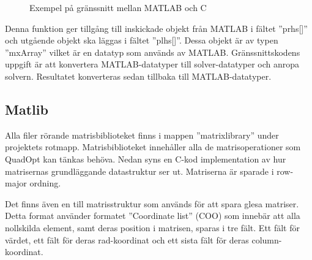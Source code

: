 \begin{figure}[H]

\caption{Exempel på gränssnitt mellan MATLAB och C}
\label{fig:mex2}
\end{figure}  

\noindent Denna funktion ger tillgång till inskickade objekt från MATLAB i fältet ''prhs[]'' och utgående objekt ska läggas i fältet ''plhs[]''. Dessa objekt är av typen ''mxArray'' vilket är en datatyp som används av MATLAB. Gränssnittskodens uppgift är att konvertera MATLAB-datatyper till solver-datatyper och anropa solvern. Resultatet konverteras sedan tillbaka till MATLAB-datatyper.


\subsection{Matlib}
Alla filer rörande matrisbiblioteket finns i mappen ''matrixlibrary'' under projektets rotmapp.
\newline
\newline
Matrisbiblioteket innehåller alla de matrisoperationer som QuadOpt kan tänkas behöva. Nedan syns en C-kod implementation av hur matrisernas grundläggande datastruktur ser ut. Matriserna är sparade i row-major ordning.



\noindent Det finns även en till matrisstruktur som används för att spara glesa matriser. Detta format använder formatet ''Coordinate list'' (COO) som innebär att alla nollskilda element, samt deras position i matrisen, sparas i tre fält. Ett fält för värdet, ett fält för deras rad-koordinat och ett sista fält för deras column-koordinat.

